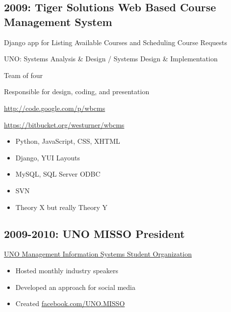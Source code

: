 \documentclass[letter,,openany,oneside]{sphinxhowto}
\begin{document}
\subsection{2009: Tiger Solutions Web Based Course Management System}
\label{resume:tiger-solutions-web-based-course-management-system}
\begin{DUlineblock}{0em}
\item[] Django app for Listing Available Courses and Scheduling Course Requests
\item[] UNO: Systems Analysis \& Design / Systems Design \& Implementation
\item[] Team of four
\item[] Responsible for design, coding, and presentation
\item[] \href{http://code.google.com/p/wbcms}{http://code.google.com/p/wbcms}
\item[] \href{https://bitbucket.org/westurner/wbcms}{https://bitbucket.org/westurner/wbcms}
\end{DUlineblock}
\begin{itemize}
\item {} 
Python, JavaScript, CSS, XHTML

\item {} 
Django, YUI Layouts

\item {} 
MySQL, SQL Server ODBC

\item {} 
SVN

\item {} 
Theory X but really Theory Y

\end{itemize}


\subsection{2009-2010: UNO MISSO President}
\label{resume:uno-misso-president}
\begin{DUlineblock}{0em}
\item[] \href{http://www.isqa.unomaha.edu/misso.htm}{UNO Management Information Systems Student Organization}
\end{DUlineblock}
\begin{itemize}
\item {} 
Hosted monthly industry speakers

\item {} 
Developed an approach for social media

\item {} 
Created \href{https://www.facebook.com/UNO.MISSO}{facebook.com/UNO.MISSO}

\end{itemize}
\end{document}
